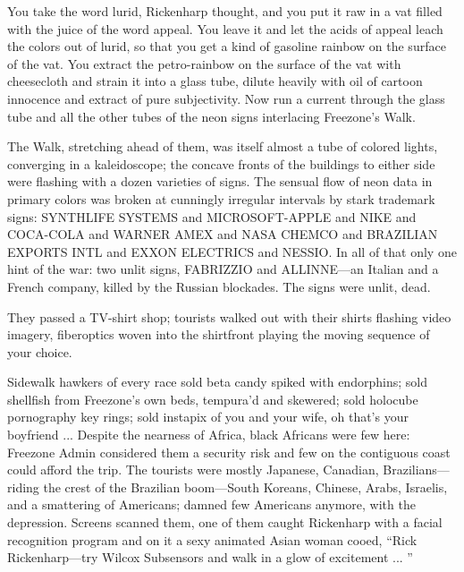 You take the word lurid, Rickenharp thought, and you put it raw in a vat filled with the juice of the word appeal. You leave it and let the acids of appeal leach the colors out of lurid, so that you get a kind of gasoline rainbow on the surface of the vat. You extract the petro-rainbow on the surface of the vat with cheesecloth and strain it into a glass tube, dilute heavily with oil of cartoon innocence and extract of pure subjectivity. Now run a current through the glass tube and all the other tubes of the neon signs interlacing Freezone's Walk.

The Walk, stretching ahead of them, was itself almost a tube of colored lights, converging in a kaleidoscope; the concave fronts of the buildings to either side were flashing with a dozen varieties of signs. The sensual flow of neon data in primary colors was broken at cunningly irregular intervals by stark trademark signs: SYNTHLIFE SYSTEMS and MICROSOFT-APPLE and NIKE and COCA-COLA and WARNER AMEX and NASA CHEMCO and BRAZILIAN EXPORTS INTL and EXXON ELECTRICS and NESSIO. In all of that only one hint of the war: two unlit signs, FABRIZZIO and ALLINNE—an Italian and a French company, killed by the Russian blockades. The signs were unlit, dead.

They passed a TV-shirt shop; tourists walked out with their shirts flashing video imagery, fiberoptics woven into the shirtfront playing the moving sequence of your choice.

Sidewalk hawkers of every race sold beta candy spiked with endorphins; sold shellfish from Freezone's own beds, tempura'd and skewered; sold holocube pornography key rings; sold instapix of you and your wife, oh that's your boyfriend ... Despite the nearness of Africa, black Africans were few here: Freezone Admin considered them a security risk and few on the contiguous coast could afford the trip. The tourists were mostly Japanese, Canadian, Brazilians—riding the crest of the Brazilian boom—South Koreans, Chinese, Arabs, Israelis, and a smattering of Americans; damned few Americans anymore, with the depression. Screens scanned them, one of them caught Rickenharp with a facial recognition program and on it a sexy animated Asian woman cooed, ``Rick Rickenharp—try Wilcox Subsensors and walk in a glow of excitement ... ''

